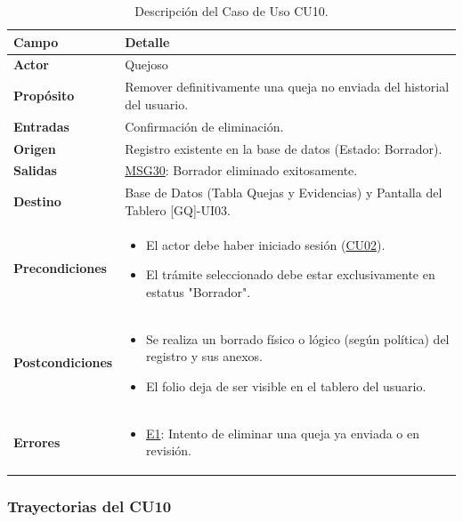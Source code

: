 \begin{appendices}
\begin{table}[htbp]
\centering
\small
\begin{tabular}{|p{3.5cm}|p{10.5cm}|}
\hline
\rowcolor[HTML]{EFEFEF} 
\textbf{Campo} & \textbf{Detalle} \\ \hline
\textbf{Actor} & Quejoso \\ \hline
\textbf{Propósito} & Remover definitivamente una queja no enviada del historial del usuario. \\ \hline
\textbf{Entradas} & Confirmación de eliminación. \\ \hline
\textbf{Origen} & Registro existente en la base de datos (Estado: Borrador). \\ \hline
\textbf{Salidas} & \hyperlink{msg:MSG30}{MSG30}: Borrador eliminado exitosamente. \\ \hline
\textbf{Destino} & Base de Datos (Tabla Quejas y Evidencias) y Pantalla del Tablero [GQ]-UI03. \\ \hline
\textbf{Precondiciones} & 
\begin{itemize}[nosep, leftmargin=*]
    \item El actor debe haber iniciado sesión (\hyperlink{anexo:casos_uso}{CU02}).
    \item El trámite seleccionado debe estar exclusivamente en estatus "Borrador".
\end{itemize} \\ \hline
\textbf{Postcondiciones} & 
\begin{itemize}[nosep, leftmargin=*]
    \item Se realiza un borrado físico o lógico (según política) del registro y sus anexos.
    \item El folio deja de ser visible en el tablero del usuario.
\end{itemize} \\ \hline
\textbf{Errores} & 
\begin{itemize}[nosep, leftmargin=*]
    \item \hyperlink{err:E15}{E1}: Intento de eliminar una queja ya enviada o en revisión.
\end{itemize} \\ \hline
\end{tabular}
\caption{Descripción del Caso de Uso CU10.}
\label{tab:cu10_especificacion}
\end{table}

\subsubsection{Trayectorias del CU10}


\end{appendices}
